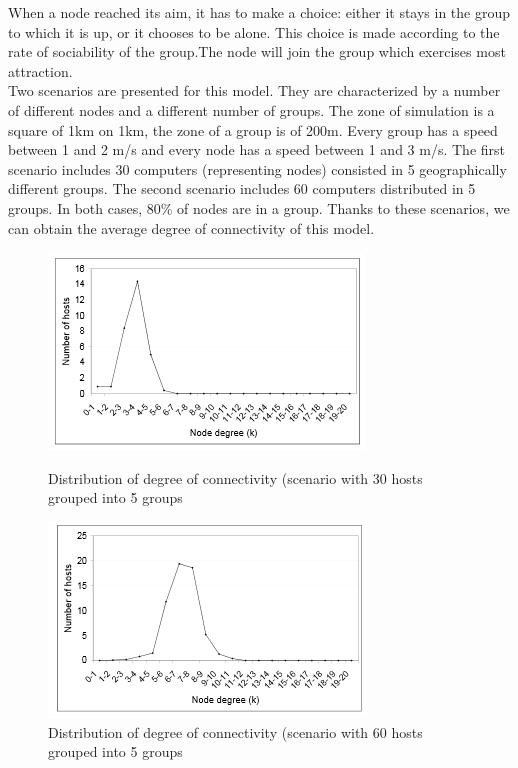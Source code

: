 When a node reached its aim, it has to make a choice:
either it stays in the group to which it is up, or
it chooses to be alone.
This choice is made according to the rate of sociability of the group.The node will join the group which exercises most attraction.\\

Two scenarios are presented for this model. They are characterized by a number of different nodes and a different number of groups.  The zone of simulation is a square of 1km on 1km, the zone of a group is of 200m. Every group has a speed between 1 and 2 m/s and every node has a speed between 1 and 3 m/s. The first scenario includes 30 computers (representing nodes) consisted in 5 geographically different groups. The second scenario includes 60 computers distributed in 5 groups. In both cases, 80\% of nodes are in a group. Thanks to these scenarios, we can obtain the average degree of connectivity of this model.\\

\begin{figure}[h!]
    \begin{minipage}[b]{0.4\linewidth}
        \centering \includegraphics[scale=1]{../images/degreeConnectivitySocialNetwork30Nodes.png}
        \caption{Distribution of degree of connectivity (scenario with 30 hosts grouped into 5 groups\cite{networkTheory5}}
    \end{minipage}\hfill
    \begin{minipage}[b]{0.48\linewidth}
        \centering \includegraphics[scale=1]{../images/degreeConnectivitySocialNetwork60Nodes.png}
        \caption{Distribution of degree of connectivity (scenario with 60 hosts grouped into 5 groups\cite{networkTheory5}}
    \end{minipage}
\end{figure}

